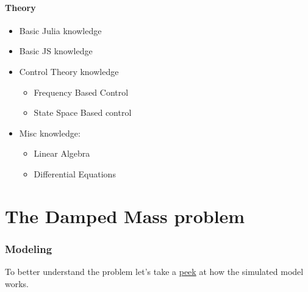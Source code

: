 \documentclass[
  a4paper,
  DIV=11,
  numbers=noendperiod]{scrreprt}
\begin{document}
\subsection{Theory}\label{theory}

\begin{itemize}
\item
  Basic Julia knowledge
\item
  Basic JS knowledge
\item
  Control Theory knowledge

  \begin{itemize}
  \item
    Frequency Based Control
  \item
    State Space Based control
  \end{itemize}
\item
  Misc knowledge:

  \begin{itemize}
  \item
    Linear Algebra
  \item
    Differential Equations
  \end{itemize}
\end{itemize}

\part{The Damped Mass problem}

\section*{Modeling}\label{modeling}


To better understand the problem let's take a
\href{https://github.com/janismac/ControlChallenges/blob/gh-pages/js/models/BlockOnSlope.js}{peek}
at how the simulated model works.
\end{document}
